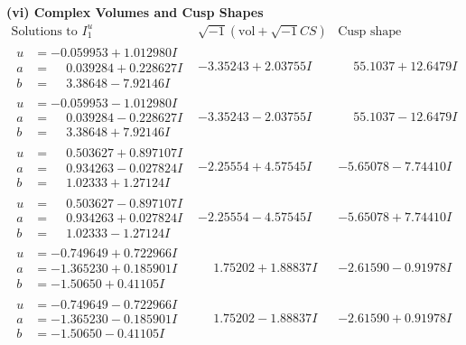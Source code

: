 \documentclass[1p]{elsarticle_modified}
\theoremstyle{definition}
\newcommand{\I}{\sqrt{-1}}
\begin{document}
\newpage\flushleft \textbf{(vi) Complex Volumes and Cusp Shapes}
$$\begin{array}{c|c|c}  
\text{Solutions to }I^u_{1}& \I (\text{vol} + \sqrt{-1}CS) & \text{Cusp shape}\\
 \hline 
\begin{aligned}
u &= -0.059953 + 1.012980 I \\
a &= \phantom{-}0.039284 + 0.228627 I \\
b &= \phantom{-}3.38648 - 7.92146 I\end{aligned}
 & -3.35243 + 2.03755 I & \phantom{-}55.1037 + 12.6479 I \\ \hline\begin{aligned}
u &= -0.059953 - 1.012980 I \\
a &= \phantom{-}0.039284 - 0.228627 I \\
b &= \phantom{-}3.38648 + 7.92146 I\end{aligned}
 & -3.35243 - 2.03755 I & \phantom{-}55.1037 - 12.6479 I \\ \hline\begin{aligned}
u &= \phantom{-}0.503627 + 0.897107 I \\
a &= \phantom{-}0.934263 - 0.027824 I \\
b &= \phantom{-}1.02333 + 1.27124 I\end{aligned}
 & -2.25554 + 4.57545 I & -5.65078 - 7.74410 I \\ \hline\begin{aligned}
u &= \phantom{-}0.503627 - 0.897107 I \\
a &= \phantom{-}0.934263 + 0.027824 I \\
b &= \phantom{-}1.02333 - 1.27124 I\end{aligned}
 & -2.25554 - 4.57545 I & -5.65078 + 7.74410 I \\ \hline\begin{aligned}
u &= -0.749649 + 0.722966 I \\
a &= -1.365230 + 0.185901 I \\
b &= -1.50650 + 0.41105 I\end{aligned}
 & \phantom{-}1.75202 + 1.88837 I & -2.61590 - 0.91978 I \\ \hline\begin{aligned}
u &= -0.749649 - 0.722966 I \\
a &= -1.365230 - 0.185901 I \\
b &= -1.50650 - 0.41105 I\end{aligned}
 & \phantom{-}1.75202 - 1.88837 I & -2.61590 + 0.91978 I \\ \hline\begin{aligned}

\end{aligned}
\end{array}$$
\end{document}
